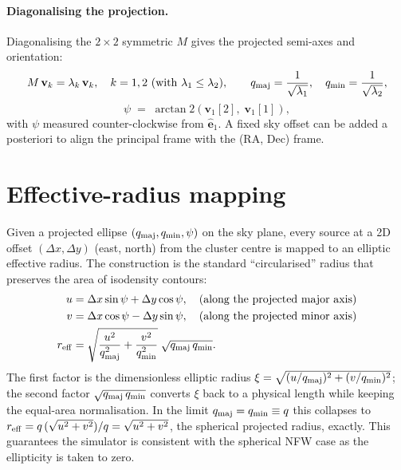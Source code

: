 \documentclass[11pt,a4paper]{article}
\newcommand{\unitvec}[1]{\hat{\mathbf{#1}}}
\newcommand{\Reff}{r_{\rm eff}}
\begin{document}
\paragraph{Diagonalising the projection.}
Diagonalising the $2\times2$ symmetric $M$ gives the projected
semi-axes and orientation:
\begin{equation}
M\,\mathbf{v}_k = \lambda_k\,\mathbf{v}_k, \quad k = 1, 2 \text{ (with }\lambda_1 \le \lambda_2\text{)},
\qquad
q_{\rm maj} = \frac{1}{\sqrt{\lambda_1}},\quad
q_{\rm min} = \frac{1}{\sqrt{\lambda_2}},
\end{equation}
\begin{equation}
\psi \;=\; \arctan2(\mathbf{v}_1[2],\;\mathbf{v}_1[1]),
\end{equation}
with $\psi$ measured counter-clockwise from $\unitvec{e}_1$. A fixed
sky offset can be added a posteriori to align the principal frame with
the (RA, Dec) frame.

\section{Effective-radius mapping}
\label{sec:effr}

Given a projected ellipse $(q_{\rm maj}, q_{\rm min}, \psi)$ on the sky
plane, every source at a 2D offset $(\Delta x, \Delta y)$ (east, north)
from the cluster centre is mapped to an elliptic effective radius. The
construction is the standard ``circularised'' radius that preserves the
area of isodensity contours:
\begin{align}
u &=  \Delta x \sin\psi + \Delta y \cos\psi,
   \quad \text{(along the projected major axis)}\\
v &=  \Delta x \cos\psi - \Delta y \sin\psi,
   \quad \text{(along the projected minor axis)}\\
\Reff &=  \sqrt{\frac{u^2}{q_{\rm maj}^2} + \frac{v^2}{q_{\rm min}^2}}
         \;\sqrt{q_{\rm maj}\,q_{\rm min}}.
\label{eq:reff}
\end{align}
The first factor is the dimensionless elliptic radius
$\xi=\sqrt{(u/q_{\rm maj})^2 + (v/q_{\rm min})^2}$; the second factor
$\sqrt{q_{\rm maj}\,q_{\rm min}}$ converts $\xi$ back to a physical
length while keeping the equal-area normalisation. In the limit
$q_{\rm maj}=q_{\rm min}\equiv q$ this collapses to
$\Reff = q\,(\sqrt{u^2+v^2})/q = \sqrt{u^2+v^2}$, the spherical projected
radius, exactly. This guarantees the simulator is consistent with the
spherical NFW case as the ellipticity is taken to zero.
\end{document}
